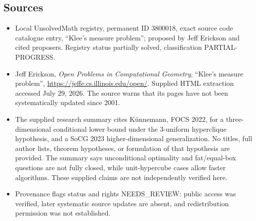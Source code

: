 \documentclass[11pt]{article}
\begin{document}
\subsection{Sources}
\begin{itemize}
\item Local UnsolvedMath registry, permanent ID 3800018, exact source code catalogue entry, ``Klee's measure problem''; proposed by Jeff Erickson and cited proposers. Registry status partially solved, classification PARTIAL-PROGRESS.
\item Jeff Erickson, \emph{Open Problems in Computational Geometry}, ``Klee's measure problem'', \url{https://jeffe.cs.illinois.edu/open/}. Supplied HTML extraction accessed July 29, 2026. The source warns that its pages have not been systematically updated since 2001.
\item The supplied research summary cites K\"unnemann, FOCS 2022, for a three-dimensional conditional lower bound under the 3-uniform hyperclique hypothesis, and a SoCG 2023 higher-dimensional generalization. No titles, full author lists, theorem hypotheses, or formulation of that hypothesis are provided. The summary says unconditional optimality and fat/equal-box questions are not fully closed, while unit-hypercube cases allow faster algorithms. These supplied claims are not independently verified here.
\item Provenance flags status and rights NEEDS\_REVIEW: public access was verified, later systematic source updates are absent, and redistribution permission was not established.
\end{itemize}
\end{document}
